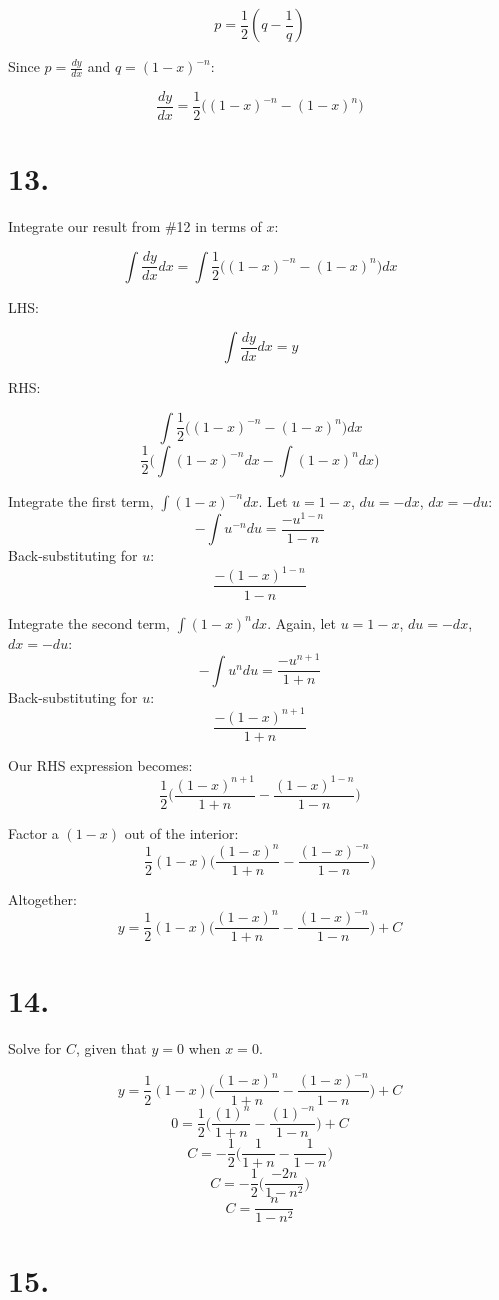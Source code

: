 \documentclass[11pt]{report}
\begin{document}
$$p = \frac{1}{2}(q - \frac{1}{q})$$

Since $p = \frac{dy}{dx}$ and $q = (1-x)^{-n}$:

$$\frac{dy}{dx} = \frac{1}{2}\Big((1-x)^{-n} - (1-x)^n\Big)$$

\section*{13.}

Integrate our result from \#12 in terms of $x$:

$$\int \frac{dy}{dx} dx = \int \frac{1}{2}\Big((1-x)^{-n} - (1-x)^n\Big) dx$$

LHS:

$$\int \frac{dy}{dx} dx = y$$

RHS:

$$\int \frac{1}{2}\Big((1-x)^{-n} - (1-x)^n\Big) dx$$
$$\frac{1}{2}\Big(\int(1-x)^{-n} dx - \int (1-x)^n dx\Big)$$

Integrate the first term, $\int(1-x)^{-n} dx$. Let $u = 1-x$, $du = -dx$, $dx = -du$:
$$-\int u^{-n} du = \frac{-u^{1-n}}{1-n}$$
Back-substituting for $u$:
$$ \frac{-(1-x)^{1-n}}{1-n} $$

Integrate the second term, $\int(1-x)^{n} dx$.
Again, let $u = 1-x$, $du = -dx$, $dx = -du$:
$$-\int u^{n} du = \frac{-u^{n+1}}{1+n}$$
Back-substituting for $u$:
$$ \frac{-(1-x)^{n+1}}{1+n} $$

Our RHS expression becomes:
$$\frac{1}{2}\Big(\frac{(1-x)^{n+1}}{1+n} - \frac{(1-x)^{1-n}}{1-n}\Big)$$

Factor a $(1-x)$ out of the interior:
$$\frac{1}{2}(1-x)\Big(\frac{(1-x)^{n}}{1+n} - \frac{(1-x)^{-n}}{1-n}\Big)$$

Altogether:
$$y = \frac{1}{2}(1-x)\Bigg(\frac{(1-x)^{n}}{1+n} - \frac{(1-x)^{-n}}{1-n}\Bigg) + C$$

\section*{14.}

Solve for $C$, given that $y=0$ when $x=0$.

$$y = \frac{1}{2}(1-x)\Bigg(\frac{(1-x)^{n}}{1+n} - \frac{(1-x)^{-n}}{1-n}\Bigg) + C$$
$$0 = \frac{1}{2}\Bigg(\frac{(1)^{n}}{1+n} - \frac{(1)^{-n}}{1-n}\Bigg) + C$$
$$C = -\frac{1}{2}\Bigg(\frac{1}{1+n} - \frac{1}{1-n}\Bigg)$$
$$C = -\frac{1}{2}\Bigg(
	\frac{-2n}{1-n^2}
	\Bigg)$$
$$C =
	\frac{n}{1-n^2}
$$

\section*{15.}
\end{document}
